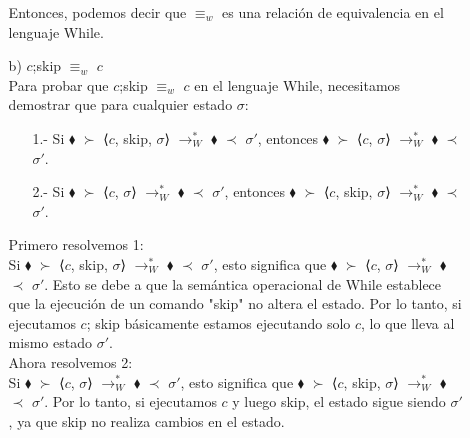 \documentclass{article}
\begin{document}
\begin{itemize}
\begin{itemize}
                Entonces, podemos decir que $\equiv_w$ es una relación de equivalencia en el lenguaje While.\\
            
            \item[b)] $c$;{\sf skip} $\equiv_w$ $c$\\

            Para probar que $c$;{\sf skip} $\equiv_w$ $c$ en el lenguaje While, necesitamos demostrar que para cualquier estado $\sigma$:

            \begin{itemize}
                \item[1.-] Si $\blacklozenge$ $\succ$  ⟨$c$, {\sf skip}, $\sigma$⟩ $\longrightarrow^{*}_{W}$ $\blacklozenge$ $\prec$ $\sigma'$, entonces $\blacklozenge$ $\succ$  ⟨$c$, $\sigma$⟩ $\longrightarrow^{*}_{W}$ $\blacklozenge$ $\prec$ $\sigma'$.

                \item[2.-] Si $\blacklozenge$ $\succ$ ⟨$c$, $\sigma$⟩ $\longrightarrow^{*}_{W}$ $\blacklozenge$ $\prec$ $\sigma'$, entonces $\blacklozenge$ $\succ$ ⟨$c$, {\sf skip}, $\sigma$⟩ $\longrightarrow^{*}_{W}$ $\blacklozenge$ $\prec$ $\sigma'$.\\
            \end{itemize}

            Primero resolvemos 1:\\

            Si $\blacklozenge$ $\succ$  ⟨$c$, {\sf skip}, $\sigma$⟩ $\longrightarrow^{*}_{W}$ $\blacklozenge$ $\prec$ $\sigma'$, esto significa que $\blacklozenge$ $\succ$  ⟨$c$, $\sigma$⟩ $\longrightarrow^{*}_{W}$ $\blacklozenge$ $\prec$ $\sigma'$. Esto se debe a que la semántica operacional de While establece que la ejecución de un comando "skip" no altera el estado. Por lo tanto, si ejecutamos $c$; {\sf skip} básicamente estamos ejecutando solo $c$, lo que lleva al mismo estado $\sigma'$.\\

            Ahora resolvemos 2:\\

            Si $\blacklozenge$ $\succ$ ⟨$c$, $\sigma$⟩ $\longrightarrow^{*}_{W}$ $\blacklozenge$ $\prec$ $\sigma'$, esto significa que $\blacklozenge$ $\succ$ ⟨$c$, {\sf skip}, $\sigma$⟩ $\longrightarrow^{*}_{W}$ $\blacklozenge$ $\prec$ $\sigma'$. Por lo tanto, si ejecutamos $c$ y luego {\sf skip}, el estado sigue siendo $\sigma'$, ya que {\sf skip} no realiza cambios en el estado.\\


\end{itemize}
\end{itemize}
\end{document}
